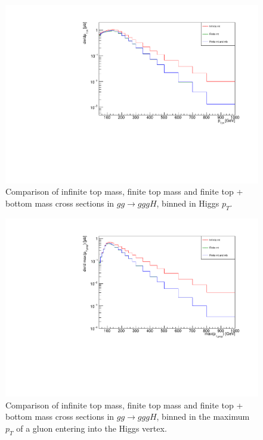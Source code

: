 \begin{figure}[H]
\centering
\includegraphics[scale=0.72]{Images/ptH_3j.pdf}
\caption{Comparison of infinite top mass, finite top mass and finite top + bottom mass cross sections in $gg \to gggH$, binned in Higgs $p_T$. }
\label{fig:pth_gg_gggH}
\end{figure}

\begin{figure}[H]
\centering
\includegraphics[scale=0.72]{Images/largestproppt.pdf}
\caption{Comparison of infinite top mass, finite top mass and finite top + bottom mass cross sections in $gg \to gggH$, binned in the maximum $p_T$ of a gluon entering into the Higgs vertex. }
\label{fig:maxprop}
\end{figure}

